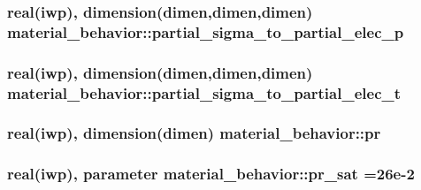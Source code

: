 \subsubsection[{partial\+\_\+sigma\+\_\+to\+\_\+partial\+\_\+elec\+\_\+p}]{\setlength{\rightskip}{0pt plus 5cm}real(iwp), dimension(dimen,dimen,dimen) material\+\_\+behavior\+::partial\+\_\+sigma\+\_\+to\+\_\+partial\+\_\+elec\+\_\+p}\label{classmaterial__behavior_a50600c5b8a42a94a1fcf054767620811}
\hypertarget{classmaterial__behavior_a7594fd35fa481baa3f66778c4bcc7e3e}{}
\subsubsection[{partial\+\_\+sigma\+\_\+to\+\_\+partial\+\_\+elec\+\_\+t}]{\setlength{\rightskip}{0pt plus 5cm}real(iwp), dimension(dimen,dimen,dimen) material\+\_\+behavior\+::partial\+\_\+sigma\+\_\+to\+\_\+partial\+\_\+elec\+\_\+t}\label{classmaterial__behavior_a7594fd35fa481baa3f66778c4bcc7e3e}
\hypertarget{classmaterial__behavior_a5e5bf5daab57f78f3551c9998660db4c}{}
\subsubsection[{pr}]{\setlength{\rightskip}{0pt plus 5cm}real(iwp), dimension(dimen) material\+\_\+behavior\+::pr}\label{classmaterial__behavior_a5e5bf5daab57f78f3551c9998660db4c}
\hypertarget{classmaterial__behavior_a002007fbb0f53f0989500f268c5d68bd}{}
\subsubsection[{pr\+\_\+sat}]{\setlength{\rightskip}{0pt plus 5cm}real(iwp), parameter material\+\_\+behavior\+::pr\+\_\+sat =26e-\/2}\label{classmaterial__behavior_a002007fbb0f53f0989500f268c5d68bd}
\hypertarget{classmaterial__behavior_af2aa779e399f21ed79a6c1d2beea23b2}{}
